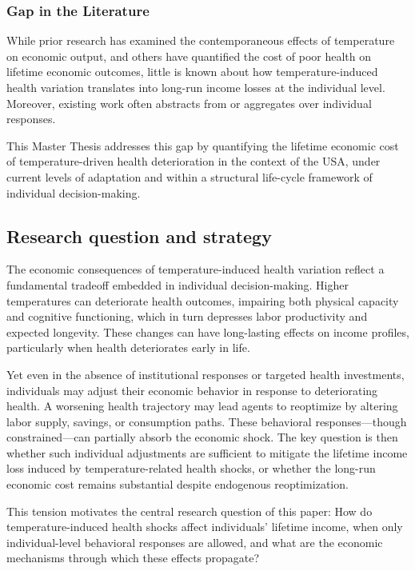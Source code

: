 \documentclass{article}
\begin{document}
\subsubsection{Gap in the Literature}

While prior research has examined the contemporaneous
effects of temperature on economic output, and others
have quantified the cost of poor health on lifetime
economic outcomes, little is known about how
temperature-induced health variation translates
into long-run income losses at the individual level.
Moreover, existing work often abstracts from or aggregates
over individual responses.

This Master Thesis addresses this gap by quantifying
the lifetime economic cost of temperature-driven health
deterioration in the context of the USA,
under current levels of adaptation and within a
structural life-cycle framework of individual decision-making.

\subsection{Research question and strategy}

The economic consequences of temperature-induced health variation reflect a fundamental tradeoff embedded in individual decision-making. Higher temperatures can deteriorate health outcomes, impairing both physical capacity and cognitive functioning, which in turn depresses labor productivity and expected longevity. These changes can have long-lasting effects on income profiles, particularly when health deteriorates early in life.

Yet even in the absence of institutional responses or targeted health investments, individuals may adjust their economic behavior in response to deteriorating health. A worsening health trajectory may lead agents to reoptimize by altering labor supply, savings, or consumption paths. These behavioral responses—though constrained—can partially absorb the economic shock. The key question is then whether such individual adjustments are sufficient to mitigate the lifetime income loss induced by temperature-related health shocks, or whether the long-run economic cost remains substantial despite endogenous reoptimization.

This tension motivates the central research question of this paper:
How do temperature-induced health shocks affect individuals’ lifetime income, when only individual-level behavioral responses are allowed, and what are the economic mechanisms through which these effects propagate?
\end{document}
